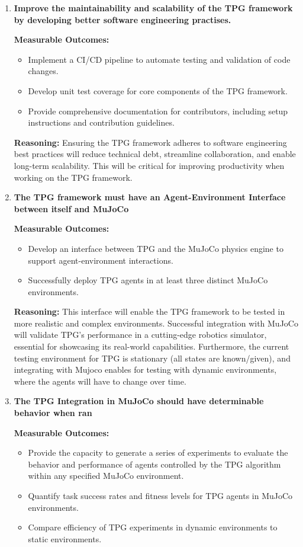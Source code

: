\documentclass{article}
\begin{document}
\begin{enumerate} [leftmargin=*]
    \item \textbf{Improve the maintainability and scalability of the TPG framework by developing better software engineering practises.}
    
    \textbf{Measurable Outcomes:}
    \begin{itemize}
      \item Implement a CI/CD pipeline to automate testing and validation of code changes.
      \item Develop unit test coverage for core components of the TPG framework.
      \item Provide comprehensive documentation for contributors, including setup instructions and contribution guidelines.
    \end{itemize}

    \textbf{Reasoning:} Ensuring the TPG framework adheres to software engineering best practices will reduce technical debt, streamline collaboration, and enable long-term scalability. This will be critical for improving productivity when working on the TPG framework.


\item \textbf{The TPG framework must have an Agent-Environment Interface between itself and MuJoCo}


    \textbf{Measurable Outcomes:}
    \begin{itemize}
      \item Develop an interface between TPG and the MuJoCo physics engine to support agent-environment interactions.
      \item Successfully deploy TPG agents in at least three distinct MuJoCo environments.
    \end{itemize}

\textbf{Reasoning:} This interface will enable the TPG framework to be tested in more realistic and complex environments. Successful integration with MuJoCo will validate TPG’s performance in a cutting-edge robotics simulator, essential for showcasing its real-world capabilities. Furthermore, the current testing environment for TPG is stationary (all states are known/given), and integrating with Mujoco enables for testing with dynamic environments, where the agents will have to change over time.


\item \textbf{The TPG Integration in MuJoCo should have determinable behavior when ran}


\textbf{Measurable Outcomes:}
    \begin{itemize}
    \item Provide the capacity to generate a series of experiments to evaluate the behavior and performance of agents controlled by the TPG algorithm within any specified MuJoCo environment.
      \item Quantify task success rates and fitness levels for TPG agents in MuJoCo environments.
      \item Compare efficiency of TPG experiments in dynamic environments to static environments.
    \end{itemize}


\end{enumerate}
\end{document}
